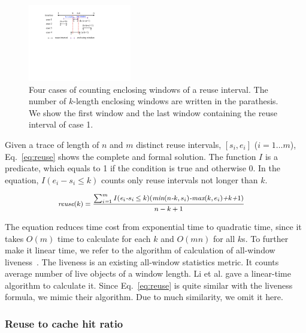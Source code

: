\documentclass[preprint,nocopyrightspace,10pt]{sigplanconf}
\begin{document}
\begin{figure}[h!]
   \centering
   \includegraphics[width=0.4\textwidth]{./figures/reuse_types.pdf}
   \caption{Four cases of counting enclosing windows of a reuse interval.
   The number of $k$-length enclosing windows are written in the parathesis.
   We show the first window and the last window containing the reuse
   interval of case 1.}
   \label{fig:reuse-count}
\end{figure}

Given a trace of length of $n$ and $m$ distinct reuse intervals, $[s_i, e_i]$ 
($i=1 \dots m$), Eq.~\ref{eq:reuse} shows the complete and formal solution. 
The function $I$ is a predicate, which equals to 1 if the condition is true and 
otherwise 0.  In the equation, $I(e_i-s_i\le k)$ counts only reuse intervals not 
longer than $k$.

\begin{equation}
\small
\begin{split}
\textit{reuse}(k) & = \frac{{\sum_{i\textit{=}1}^{m}I(\textit{e}_i\textit{-}s_\textit{i} \le k)(\textit{min}(n\textit{-}k, s_{i} ) \textit{-max} ( k, e_{i} )\textit{+}k\textit{+}1)}}{n-k+1}
\end{split}
\label{eq:reuse}
\end{equation}

The equation reduces time cost from exponential time to quadratic time, since
it takes $O(m)$ time to calculate for each $k$ and $O(mn)$ for all $k$s. 
To further make it linear time, we refer to the algorithm of calculation of all-window 
liveness~\cite{Li+:ISMM14, LiD:MSPC13, DingL:MSPC14}. The liveness
is an existing all-window statistics metric. It counts average number of live objects 
of a window length. Li et al. gave a linear-time algorithm to calculate it. Since
Eq.~\ref{eq:reuse} is quite similar with the liveness formula, we mimic their algorithm.
Due to much similarity, we omit it here.

\subsubsection{Reuse to cache hit ratio}
\end{document}
